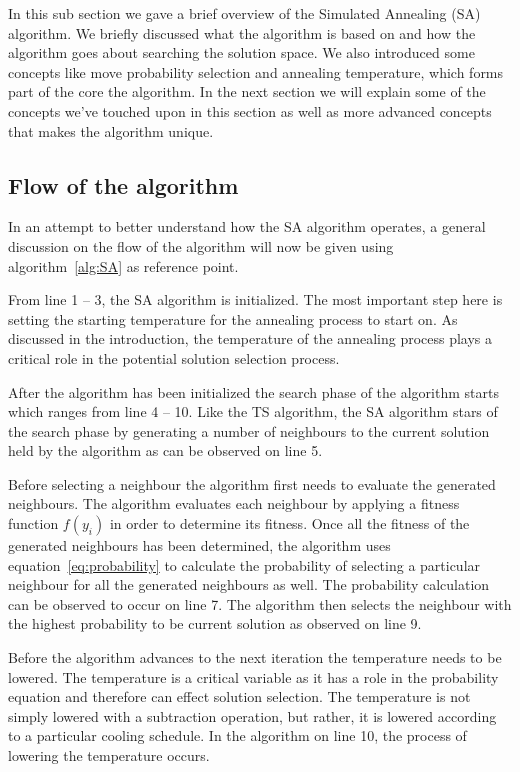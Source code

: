 In this sub section we gave a brief overview of the Simulated Annealing (SA) algorithm. We briefly discussed what the algorithm is based on and how the algorithm goes about searching the solution space. We also introduced some concepts like move probability selection and annealing temperature, which forms part of the core the algorithm. In the next section we will explain some of the concepts we've touched upon in this section as well as more advanced concepts that makes the algorithm unique.

\subsection{Flow of the algorithm}
In an attempt to better understand how the SA algorithm operates, a general discussion on the flow of the algorithm will now be given using algorithm~\ref{alg:SA} as reference point.

From line 1 -- 3, the SA algorithm is initialized. The most important step here is setting the starting temperature for the annealing process to start on. As discussed in the introduction, the temperature of the annealing process plays a critical role in the potential solution selection process.

After the algorithm has been initialized the search phase of the algorithm starts which ranges from line 4 -- 10. Like the TS algorithm, the SA algorithm stars of the search phase by generating a number of neighbours to the current solution held by the algorithm as can be observed on line 5.

Before selecting a neighbour the algorithm first needs to evaluate the generated neighbours. The algorithm evaluates each neighbour by applying a fitness function $f(y_i)$ in order to determine its fitness.
Once all the fitness of the generated neighbours has been determined, the algorithm uses equation~\ref{eq:probability} to calculate the probability of selecting a particular neighbour for all the generated neighbours as well. The probability calculation can be observed to occur on line 7. The algorithm then selects the neighbour with the highest probability to be current solution as observed on line 9. 

Before the algorithm advances to the next iteration the temperature needs to be lowered. The temperature is a critical variable as it has a role in the probability equation and therefore can effect solution selection. The temperature is not simply lowered with a subtraction operation, but rather, it is lowered according to a particular cooling schedule. In the algorithm on line 10, the process of lowering the temperature occurs.

